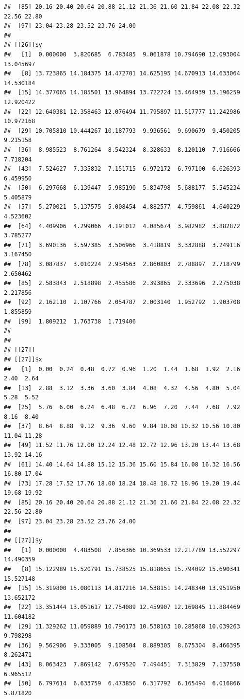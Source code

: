 \documentclass[
  ignorenonframetext,
]{beamer}
\begin{document}
\begin{frame}[fragile]{}
\begin{verbatim}
##  [85] 20.16 20.40 20.64 20.88 21.12 21.36 21.60 21.84 22.08 22.32 22.56 22.80
##  [97] 23.04 23.28 23.52 23.76 24.00
## 
## [[26]]$y
##   [1]  0.000000  3.820685  6.783485  9.061878 10.794690 12.093004 13.045697
##   [8] 13.723865 14.184375 14.472701 14.625195 14.670913 14.633064 14.530184
##  [15] 14.377065 14.185501 13.964894 13.722724 13.464939 13.196259 12.920422
##  [22] 12.640381 12.358463 12.076494 11.795897 11.517777 11.242986 10.972168
##  [29] 10.705810 10.444267 10.187793  9.936561  9.690679  9.450205  9.215158
##  [36]  8.985523  8.761264  8.542324  8.328633  8.120110  7.916666  7.718204
##  [43]  7.524627  7.335832  7.151715  6.972172  6.797100  6.626393  6.459950
##  [50]  6.297668  6.139447  5.985190  5.834798  5.688177  5.545234  5.405879
##  [57]  5.270021  5.137575  5.008454  4.882577  4.759861  4.640229  4.523602
##  [64]  4.409906  4.299066  4.191012  4.085674  3.982982  3.882872  3.785277
##  [71]  3.690136  3.597385  3.506966  3.418819  3.332888  3.249116  3.167450
##  [78]  3.087837  3.010224  2.934563  2.860803  2.788897  2.718799  2.650462
##  [85]  2.583843  2.518898  2.455586  2.393865  2.333696  2.275038  2.217856
##  [92]  2.162110  2.107766  2.054787  2.003140  1.952792  1.903708  1.855859
##  [99]  1.809212  1.763738  1.719406
## 
## 
## [[27]]
## [[27]]$x
##   [1]  0.00  0.24  0.48  0.72  0.96  1.20  1.44  1.68  1.92  2.16  2.40  2.64
##  [13]  2.88  3.12  3.36  3.60  3.84  4.08  4.32  4.56  4.80  5.04  5.28  5.52
##  [25]  5.76  6.00  6.24  6.48  6.72  6.96  7.20  7.44  7.68  7.92  8.16  8.40
##  [37]  8.64  8.88  9.12  9.36  9.60  9.84 10.08 10.32 10.56 10.80 11.04 11.28
##  [49] 11.52 11.76 12.00 12.24 12.48 12.72 12.96 13.20 13.44 13.68 13.92 14.16
##  [61] 14.40 14.64 14.88 15.12 15.36 15.60 15.84 16.08 16.32 16.56 16.80 17.04
##  [73] 17.28 17.52 17.76 18.00 18.24 18.48 18.72 18.96 19.20 19.44 19.68 19.92
##  [85] 20.16 20.40 20.64 20.88 21.12 21.36 21.60 21.84 22.08 22.32 22.56 22.80
##  [97] 23.04 23.28 23.52 23.76 24.00
## 
## [[27]]$y
##   [1]  0.000000  4.483508  7.856366 10.369533 12.217789 13.552297 14.490359
##   [8] 15.122989 15.520791 15.738525 15.818655 15.794092 15.690341 15.527148
##  [15] 15.319800 15.080113 14.817216 14.538151 14.248340 13.951950 13.652172
##  [22] 13.351444 13.051617 12.754089 12.459907 12.169845 11.884469 11.604182
##  [29] 11.329262 11.059889 10.796173 10.538163 10.285868 10.039263  9.798298
##  [36]  9.562906  9.333005  9.108504  8.889305  8.675304  8.466395  8.262471
##  [43]  8.063423  7.869142  7.679520  7.494451  7.313829  7.137550  6.965512
##  [50]  6.797614  6.633759  6.473850  6.317792  6.165494  6.016866  5.871820

\end{verbatim}
\end{frame}
\end{document}
